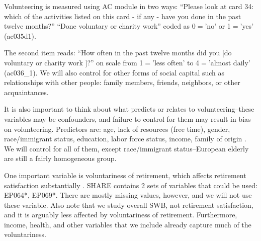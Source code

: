 \documentclass[10pt, letterpaper]{article}
\begin{document}
\begin{spacing}{1.4}
Volunteering is measured using AC module in two ways: ``Please look at card 34: which of the activities listed on this card - if any - have you done in the past twelve
months?'' ``Done voluntary or charity work'' coded as 0$=$'no' or 
1$=$'yes'  (ac035d1). 

The second item reads: ``How often in the past twelve
months did you [do voluntary or charity work%
]?'' on scale from 1$=$'less often' to 4$=$'almost
daily' (ac036\_1). We will also control for other  forms of social capital such
as relationships with other people: family members, friends, neighbors, or other acquaintances. %
%
%
%

It is also important to think about what predicts or relates to
volunteering--these variables may be confounders, and failure to control for them may result in bias on
volunteering.  Predictors are: age, lack of resources (free
time), gender, race/immigrant status, education, labor force status, income,
family of origin \citet{wilson12,haski09}. %
 We will control for all of them, except race/immigrant status--European elderly
 are still a fairly homogeneous group. 


One important variable is voluntariness of retirement, which
affects retirement satisfaction substantially \citep{bender12}.  SHARE
contains 2 sets of variables that could be used: EP064*, EP069*.
There are mostly missing values, however, and we will not use these variable. Also note that  we study
overall SWB, not retirement satisfaction, and it is arguably less affected by
voluntariness of retirement. Furthermore, income, health, and other variables that we
include already capture much of the voluntariness.



\end{spacing}
\end{document}

